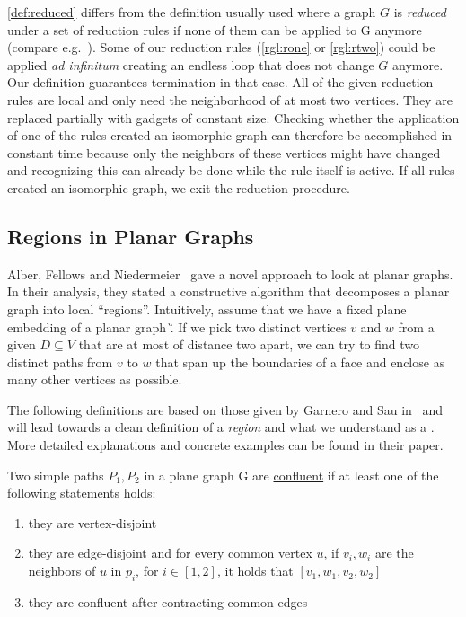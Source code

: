 \cref{def:reduced} differs from the definition usually used where a graph $G$ is \textit{reduced} under a set of reduction rules if none of them can be applied to G anymore (compare e.g.~\cite{Fomin2019}). Some of our reduction rules (\cref{rgl:rone} or \cref{rgl:rtwo}) could be applied \textit{ad infinitum} creating an endless loop that does not change $G$ anymore. Our definition guarantees termination in that case. 
All of the given reduction rules are local and only need the neighborhood of at most two vertices.
They are replaced partially with gadgets of constant size.  
Checking whether the application of one of the rules created an isomorphic graph can therefore be accomplished in constant time because only the neighbors of these vertices might have changed and recognizing this can already be done while the rule itself is active. 
If all rules created an isomorphic graph, we exit the reduction procedure.

\subsection{Regions in Planar Graphs}

Alber, Fellows and Niedermeier~\cite{Alber2004} gave a novel approach to look at planar graphs. In their analysis, they stated a constructive algorithm that decomposes a planar graph into local ``regions''. Intuitively, assume that we have a fixed plane embedding of a planar graph \G. If we pick two distinct vertices $v$ and $w$ from a given \sdom $D \subseteq V$ that are at most of distance two apart, we can try to find two distinct paths from $v$ to $w$ that span up the boundaries of a face and enclose as many other vertices as possible. 

The following definitions are based on those given by Garnero and Sau in~\cite[arXiv v2]{Garnero2018} and will lead towards a clean definition of a \textit{region} and what we understand as a \dreg. More detailed explanations and concrete examples can be found in their paper.

\begin{definition}
    Two simple paths $P_1, P_2$ in a plane graph G are \underline{confluent} if at least one of the following statements holds:
    
    \begin{enumerate}
        \item they are vertex-disjoint
        \item they are edge-disjoint and for every common vertex $u$, if $v_i, w_i$ are the neighbors of $u$ in $p_i$, for $i \in [1,2]$, it holds that $[v_1, w_1, v_2, w_2]$
        \item they are confluent after contracting common edges
    \end{enumerate}
\end{definition}

